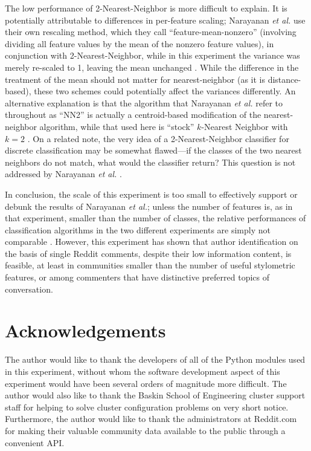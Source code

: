 \documentclass{article}
\begin{document}
The low performance of 2-Nearest-Neighbor is more difficult to explain. It is potentially attributable to differences in per-feature scaling; Narayanan \textit{et al.} use their own rescaling method, which they call ``feature-mean-nonzero'' (involving dividing all feature values by the mean of the nonzero feature values), in conjunction with 2-Nearest-Neighbor, while in this experiment the variance was merely re-scaled to 1, leaving the mean unchanged \cite{narayanan2012feasibility}. While the difference in the treatment of the mean should not matter for nearest-neighbor (as it is distance-based), these two schemes could potentially affect the variances differently. An alternative explanation is that the algorithm that Narayanan \textit{et al.} refer to throughout as ``NN2'' is actually a centroid-based modification of the nearest-neighbor algorithm, while that used here is ``stock'' $k$-Nearest Neighbor with $k=2$ \cite{narayanan2012feasibility}. On a related note, the very idea of a 2-Nearest-Neighbor classifier for discrete classification may be somewhat flawed---if the classes of the two nearest neighbors do not match, what would the classifier return? This question is not addressed by Narayanan \textit{et al.} \cite{narayanan2012feasibility}.

In conclusion, the scale of this experiment is too small to effectively support or debunk the results of Narayanan \textit{et al.}; unless the number of features is, as in that experiment, smaller than the number of classes, the relative performances of classification algorithms in the two different experiments are simply not comparable \cite{narayanan2012feasibility}. However, this experiment has shown that author identification on the basis of single Reddit comments, despite their low information content, is feasible, at least in communities smaller than the number of useful stylometric features, or among commenters that have distinctive preferred topics of conversation.

\section{Acknowledgements}
The author would like to thank the developers of all of the Python modules used in this experiment, without whom the software development aspect of this experiment would have been several orders of magnitude more difficult. The author would also like to thank the Baskin School of Engineering cluster support staff for helping to solve cluster configuration problems on very short notice. Furthermore, the author would like to thank the administrators at Reddit.com for making their valuable community data available to the public through a convenient API.
\end{document}
